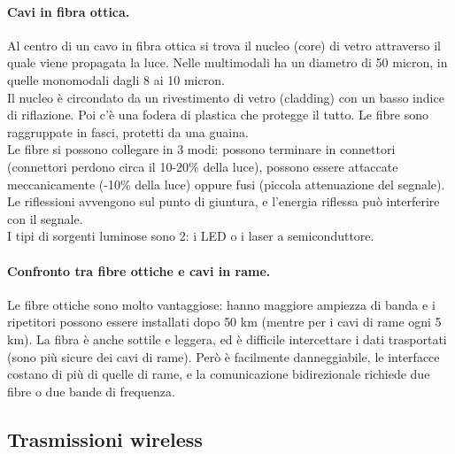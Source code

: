 \documentclass{article}
\begin{document}
		\paragraph{Cavi in fibra ottica.}
		Al centro di un cavo in fibra ottica si trova il nucleo (core) di vetro attraverso il quale viene propagata la luce. Nelle multimodali ha un diametro di 50 micron, in quelle monomodali dagli 8 ai 10 micron.\\
		Il nucleo è circondato da un rivestimento di vetro (cladding) con un basso indice di riflazione. Poi c'è una fodera di plastica che protegge il tutto. Le fibre sono raggruppate in fasci, protetti da una guaina.\\
		Le fibre si possono collegare in 3 modi: possono terminare in connettori (connettori perdono circa il 10-20\% della luce), possono essere attaccate meccanicamente (-10\% della luce) oppure fusi (piccola attenuazione del segnale). Le riflessioni avvengono sul punto di giuntura, e l'energia riflessa può interferire con il segnale.\\
		I tipi di sorgenti luminose sono 2: i LED o i laser a semiconduttore.
		\paragraph{Confronto tra fibre ottiche e cavi in rame.}
		Le fibre ottiche sono molto vantaggiose: hanno maggiore ampiezza di banda e i ripetitori possono essere installati dopo 50 km (mentre per i cavi di rame ogni 5 km). La fibra è anche sottile e leggera, ed è difficile intercettare i dati trasportati (sono più sicure dei cavi di rame). Però è facilmente danneggiabile, le interfacce costano di più di quelle di rame, e la comunicazione bidirezionale richiede due fibre o due bande di frequenza.
		\subsection{Trasmissioni wireless}
\end{document}
